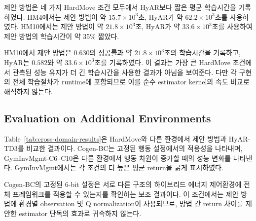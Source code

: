 \documentclass[10pt,journal]{IEEEtran}
\begin{document}
제안 방법은 네 가지 HardMove 조건 모두에서 HyAR보다 짧은 평균 학습시간을 기록하였다. HM4에서는 제안 방법이 약 $15.7\times10^3$초, HyAR가 약 $62.2\times10^3$초를 사용하였다. HM10에서는 제안 방법이 약 $21.8\times10^3$초, HyAR가 약 $33.6\times10^3$초를 사용하여 제안 방법의 학습시간이 약 35\% 짧았다.

HM10에서 제안 방법은 $0.630$의 성공률과 약 $21.8\times10^3$초의 학습시간을 기록하고, HyAR는 $0.582$와 약 $33.6\times10^3$초를 기록하였다. 이 결과는 가장 큰 HardMove 조건에서 관측된 성능 유지가 더 긴 학습시간을 사용한 결과가 아님을 보여준다. 다만 각 구현의 전체 학습절차가 runtime에 포함되므로 이를 순수 estimator kernel의 속도 비교로 해석하지 않는다.


\subsection{Evaluation on Additional Environments}

Table~\ref{tab:cross-domain-results}은 HardMove와 다른 환경에서 제안 방법과 HyAR-TD3를 비교한 결과이다. Cogen-BC는 고정된 행동 설정에서의 적용성을 나타내며, GymInvMgmt-C6--C10은 다른 환경에서 행동 차원이 증가할 때의 성능 변화를 나타낸다. GymInvMgmt에서는 각 조건의 더 높은 평균 return을 굵게 표시하였다.

\begin{table}[t]
\centering
\caption{
Final return on additional environments over five training seeds.
Boldface marks the higher mean for the GymInvMgmt comparisons.
}
\label{tab:cross-domain-results}
\end{table}

Cogen-BC의 고정된 6-bit 설정은 서로 다른 구조의 하이브리드 에너지 제어환경에 전체 프레임워크를 적용할 수 있는지를 확인하는 보조 결과이다. 이 조건에서는 제안 방법에 환경별 observation 및 Q normalization이 사용되므로, 방법 간 return 차이를 제안한 estimator 단독의 효과로 귀속하지 않는다.
\end{document}
